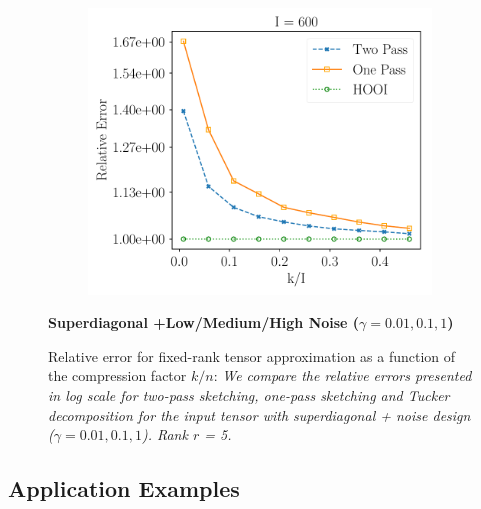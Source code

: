\begin{figure}[H]
\begin{subfigure}{0.32\textwidth}
    \includegraphics[scale = 0.3]{figure/id_hnoise_n600.pdf}
    \end{subfigure}
    \textbf{Superdiagonal +Low/Medium/High Noise ($\gamma = 0.01,0.1,1$)}
\caption{Relative error for fixed-rank tensor approximation as a function of the compression factor $k/n$: \textit{We compare the relative errors presented in log scale for two-pass sketching, one-pass sketching and Tucker decomposition for the input tensor with superdiagonal + noise design ($\gamma = 0.01,0.1,1$). Rank $r$ = 5.}} \label{fig:id_lnoise}
\end{figure}

\subsection{Application Examples}

